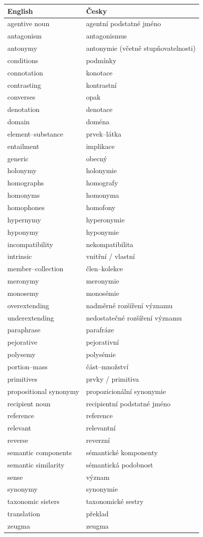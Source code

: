 \documentclass[a4paper,landscape,headrule,footrule,xetex]{foils}
\begin{document}
\begin{longtable}{ll}
  English & Česky \\\hline \endhead
agentive noun & agentní podstatné jméno \\
antagonism & antagonismus \\
antonymy & antonymie (včetně stupňovatelnosti) \\
conditions & podmínky \\
connotation & konotace \\
contrasting & kontrastní \\
converses & opak \\
denotation & denotace \\
domain & doména \\
element–substance & prvek–látka \\
entailment & implikace \\
generic & obecný \\
holonymy & holonymie \\
homographs & homografy \\
homonyms & homonyma \\
homophones & homofony \\
hypernymy & hyperonymie \\
hyponymy & hyponymie \\
incompatibility & nekompatibilita \\
intrinsic & vnitřní / vlastní \\
member–collection & člen–kolekce \\
meronymy & meronymie \\
monosemy & monosémie \\
overextending & nadměrné rozšíření významu \\
underextending & nedostatečné rozšíření významu \\
paraphrase & parafráze \\
pejorative & pejorativní \\
polysemy & polysémie \\
portion–mass & část–množství \\
primitives & prvky / primitiva \\
propositional synonymy & propozicionální synonymie \\
recipient noun & recipientní podstatné jméno \\
reference & reference \\
relevant & relevantní \\
reverse & reverzní \\
semantic components & sémantické komponenty \\
semantic similarity & sémantická podobnost \\
sense & význam \\
synonymy & synonymie \\
taxonomic sisters & taxonomické sestry \\
translation & překlad \\
zeugma & zeugma \\
\end{longtable}
\end{document}
